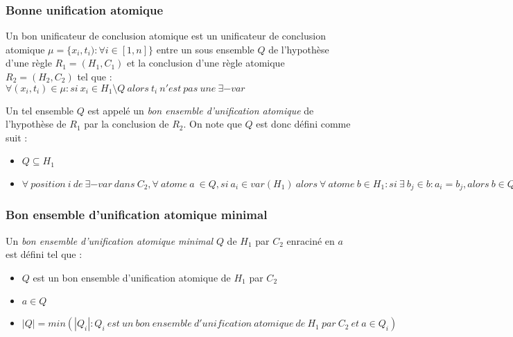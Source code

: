 \subsubsection{Bonne unification atomique}\label{def_bonneunification}
Un bon unificateur de conclusion atomique est un unificateur de conclusion atomique $\mu = \{x_{i},t_{i}) : \forall i \in [1,n]\}$
entre un sous ensemble $Q$ de l'hypoth\`ese d'une r\`egle $R_{1} = (H_{1},C_{1})$ et la conclusion d'une r\`egle atomique
$R_{2} = (H_{2},C_{2})$ tel que :\\
$\forall (x_{i},t_{i}) \in \mu : si\ x_{i} \in H_{1} \setminus Q\ alors\ t_{i}\ n'est\ pas\ une\ \exists-var$

Un tel ensemble $Q$ est appel\'e un {\em bon ensemble d'unification atomique} de l'hypoth\`ese de $R_{1}$ par la conclusion de $R_{2}$.
On note que $Q$ est donc d\'efini comme suit :
\begin{itemize}
	\item $Q \subseteq H_{1}$
	\item $\forall\ position\ i\ de\ \exists-var\ dans\ C_{2}, \forall\ atome\ a\ \in Q, si\ a_i \in var(H_{1})\ alors\ \forall\ atome\ b \in H_{1} : si\ \exists\ b_j \in b : a_i = b_j, alors\ b \in Q$
\end{itemize}

\subsubsection{Bon ensemble d'unification atomique minimal}\label{def_bonensemble}
Un {\em bon ensemble d'unification atomique minimal} $Q$ de $H_{1}$ par $C_{2}$ enracin\'e en $a$ est d\'efini tel que :
\begin{itemize}
	\item $Q$ est un bon ensemble d'unification atomique de $H_{1}$ par $C_{2}$
	\item $a \in Q$
	\item $|Q| = min(|Q_i| : Q_i\ est\ un\ bon\ ensemble\ d'unification\ atomique\ de\ H_1\ par\ C_2\ et\ a \in Q_i)$
\end{itemize}


